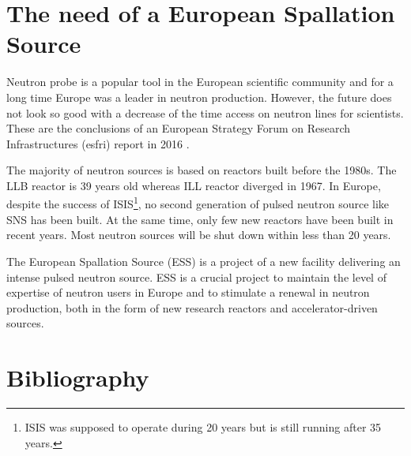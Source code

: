 \begin{refsection}
  

  \section{The need of a European Spallation Source}
  \label{ch1:Summary}
  Neutron probe is a popular tool in the European scientific community and for a long time Europe was a leader in neutron production. However, the future does not look so good with a decrease of the time access on neutron lines for scientists. These are the conclusions of an European Strategy Forum on Research Infrastructures (\acrshort{esfri}) report in 2016 \cite{neutron2016}.

  The majority of neutron sources is based on reactors built before the 1980s.
  The LLB reactor is 39 years old whereas ILL reactor diverged in 1967. In Europe, despite the success of ISIS\footnote{ISIS was supposed to operate during 20 years but is still running after 35 years.}, no second generation of pulsed neutron source like SNS has been built. At the same time, only few new reactors have been built in recent years. Most neutron sources will be shut down within less than 20 years.

  The European Spallation Source (ESS) is a project of a new facility delivering an intense pulsed neutron source. ESS is a crucial project to maintain the level of expertise of neutron users in Europe and to stimulate a renewal in neutron production, both in the form of new research reactors and accelerator-driven sources.

  

  \cleardoublepage
  \section{Bibliography}

  \printbibliography[heading=subbibliography]
\end{refsection}
